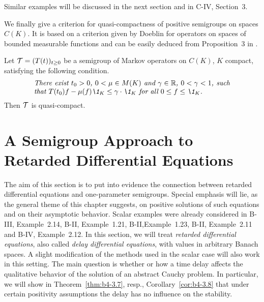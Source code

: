 Similar examples will be discussed in the next section and in  C-IV, Section~3.

We finally give a criterion for quasi-compactness of positive semigroups on spaces $C(K)$. 
It is based on a criterion given by Doeblin for operators on spaces of bounded measurable functions and can be easily deduced from  Proposition~3 in \citet{lotz:1981}.
\begin{proposition}\label{prop:b4-2.13}
%
%
	Let $\mathcal{T} = (T(t))_{t \geq 0}$ be a semigroup of Markov operators on $C(K)$, $K$ compact, satisfying the following condition.
\begin{equation*}\label{eq:b4-2.12}	
\begin{minipage}{.8\textwidth}
%	
\textit{There exist $t_{0} > 0$, $ 0 < \mu \in M(K)$ and  $\gamma \in \mathbb{R}$, $0 < \gamma < 1 $, 
such that  $T(t_{0})f - \mu(f)\1_K \leq \gamma \cdot \1_K$  for all   $0 \leq f \leq \1_K$.}
%
\end{minipage}
\end{equation*}
Then $\mathcal{T}$ is quasi-compact.
\end{proposition}


\section{A Semigroup Approach to Retarded Differential 
Equations}
\hspace{1cm}{\Large by Annette Grabosch und Ulrich Moustakas}
\vspace{.5cm}
\newline
The aim of this section is to put into evidence the connection between retarded differential equations and one-parameter semigroups.
Special emphasis will lie, as the general theme of this chapter suggests, on positive solutions of such equations and on their asymptotic behavior.
Scalar examples were already considered in B-III, Example~2.14, B-II, Example~1.21, B-II,Example~1.23, B-II, Example~2.11 and B-IV, Example~2.12.
In this section, we will treat \emph{retarded differential equations}, also called \emph{delay differential equations}, with values in arbitrary Banach spaces.
A slight modification of the methods used in the scalar case will also work in this setting.
The main question is whether or how a time delay affects the qualitative behavior of the solution of an abstract Cauchy problem.
In particular, we will show in Theorem~\ref{thm:b4-3.7}, resp., Corollary~\ref{cor:b4-3.8} that under certain positivity assumptions the delay has no influence on the stability.

